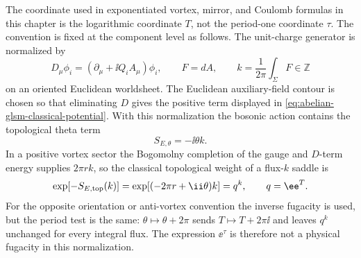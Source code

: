 \begin{remark}
\label{rem:glsm-compact-fi-theta-normalization}
The coordinate used in exponentiated vortex, mirror, and Coulomb formulas in
this chapter is the logarithmic coordinate \(T\), not the period-one coordinate
\(\tau\).  The convention is fixed at the component level as follows.  The
unit-charge generator is normalized by
\[
  D_\mu\phi_i=(\partial_\mu+\ii Q_iA_\mu)\phi_i,\qquad
  F=dA,\qquad
  k=\frac1{2\pi}\int_\Sigma F\in\mathbb Z
\]
on an oriented Euclidean worldsheet.  The Euclidean auxiliary-field contour is
chosen so that eliminating \(D\) gives the positive term displayed in
\eqref{eq:abelian-glsm-classical-potential}.  With this normalization the
bosonic action contains the topological theta term
\[
  S_{E,\theta}=-\ii\theta k .
\]
In a positive vortex sector the Bogomolny completion of the gauge and
\(D\)-term energy supplies \(2\pi r k\), so the classical topological weight
of a flux-\(k\) saddle is
\begin{equation}
  \exp[-S_{E,{\rm top}}(k)]
  =
  \exp\!\left[(-2\pi r+\ii\theta)k\right]
  =
  q^k,
  \qquad q=\ee^T .
  \label{eq:glsm-compact-flux-topological-weight}
\end{equation}
For the opposite orientation or anti-vortex convention the inverse fugacity is
used, but the period test is the same: \(\theta\mapsto\theta+2\pi\) sends
\(T\mapsto T+2\pi\ii\) and leaves \(q^k\) unchanged for every integral flux.
The expression \(\ee^\tau\) is therefore not a physical fugacity in this
normalization.
\end{remark}

